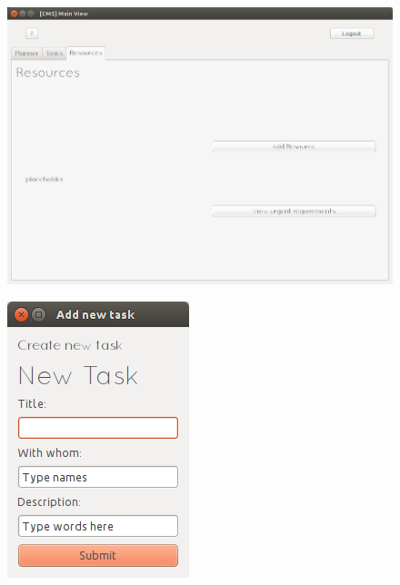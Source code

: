 	\begin{figure}[H]
		\includegraphics[width=\textwidth]{./Design/proto/4.png}
	\end{figure}
	\begin{figure}[H]
		\includegraphics[width=\textwidth]{./Design/proto/5.png}
	\end{figure}
